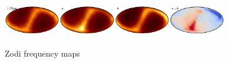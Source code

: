 \documentclass{aa}
\begin{document}
\begin{figure}
    \includegraphics[width=0.22\textwidth]{figs/zodi/zodi_01_tot.pdf}\includegraphics[width=0.22\textwidth]{figs/zodi/zodi_01_a.pdf}\includegraphics[width=0.22\textwidth]{figs/zodi/zodi_10_b.pdf}\includegraphics[width=0.22\textwidth]{figs/zodi/zodi_01_a-b.pdf}

    \caption{Zodi frequency maps}
    \label{fig:zodi_freq}
  \end{figure}
\end{document}
